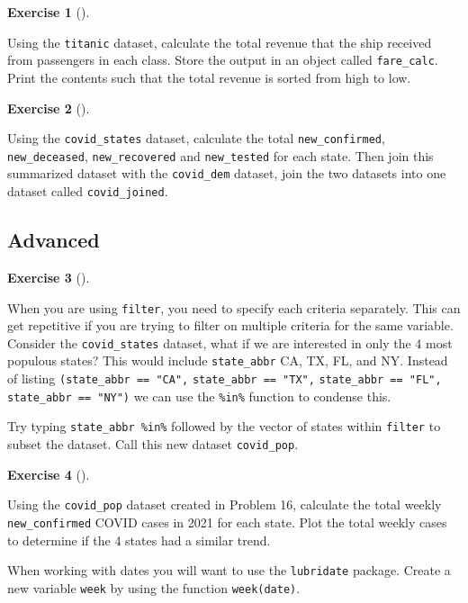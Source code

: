 \documentclass[
  letterpaper,
  DIV=11,
  numbers=noendperiod]{scrreprt}
\theoremstyle{definition}
\newtheorem{exercise}{Exercise}[chapter]
\theoremstyle{remark}
\begin{document}
\leavevmode{}%
\begin{exercise}[]\label{exr-ch03-app3}

Using the \texttt{titanic} dataset, calculate the total revenue that the
ship received from passengers in each class. Store the output in an
object called \texttt{fare\_calc}. Print the contents such that the
total revenue is sorted from high to low.

\end{exercise}

\leavevmode{}%
\begin{exercise}[]\label{exr-ch03-app4}

Using the \texttt{covid\_states} dataset, calculate the total
\texttt{new\_confirmed}, \texttt{new\_deceased}, \texttt{new\_recovered}
and \texttt{new\_tested} for each state. Then join this summarized
dataset with the \texttt{covid\_dem} dataset, join the two datasets into
one dataset called \texttt{covid\_joined}.

\end{exercise}

\hypertarget{sec-ex03-advanced}{%
\subsection{Advanced}\label{sec-ex03-advanced}}

\leavevmode{}%
\begin{exercise}[]\label{exr-ch03-adv1}

When you are using \texttt{filter}, you need to specify each criteria
separately. This can get repetitive if you are trying to filter on
multiple criteria for the same variable. Consider the
\texttt{covid\_states} dataset, what if we are interested in only the 4
most populous states? This would include \texttt{state\_abbr} CA, TX,
FL, and NY. Instead of listing \texttt{(state\_abbr\ ==\ "CA",}
\texttt{state\_abbr\ ==\ "TX",} \texttt{state\_abbr\ ==\ "FL",}
\texttt{state\_abbr\ ==\ "NY")} we can use the \texttt{\%in\%} function
to condense this.

Try typing \texttt{state\_abbr\ \%in\%} followed by the vector of states
within \texttt{filter} to subset the dataset. Call this new dataset
\texttt{covid\_pop}.

\end{exercise}

\leavevmode{}%
\begin{exercise}[]\label{exr-ch03-adv2}

Using the \texttt{covid\_pop} dataset created in Problem 16, calculate
the total weekly \texttt{new\_confirmed} COVID cases in 2021 for each
state. Plot the total weekly cases to determine if the 4 states had a
similar trend.

When working with dates you will want to use the \texttt{lubridate}
package. Create a new variable \texttt{week} by using the function
\texttt{week(date)}.

\end{exercise}
\end{document}
